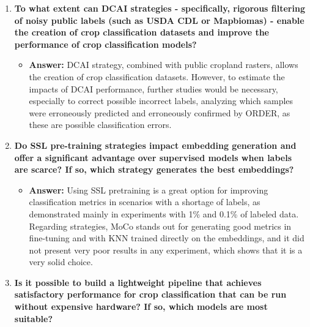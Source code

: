 \begin{enumerate}[label=\textbf{RQ\arabic*:}, leftmargin=*, parsep=1em]

    \item \textbf{To what extent can DCAI strategies - specifically, rigorous filtering of noisy public labels (such as USDA CDL or Mapbiomas) - enable the creation of crop classification datasets and improve the performance of crop classification models?}
    
    \begin{itemize}[label=$\hookrightarrow$, leftmargin=2em, topsep=0.5em]
        \item \textbf{Answer:}
        DCAI strategy, combined with public cropland rasters, allows the creation of crop classification datasets. However, to estimate the impacts of DCAI performance, further studies would be necessary, especially to correct possible incorrect labels, analyzing which samples were erroneously predicted and erroneously confirmed by ORDER, as these are possible classification errors.
    \end{itemize}

    \item \textbf{Do SSL pre-training strategies impact embedding generation and offer a significant advantage over supervised models when labels are scarce? If so, which strategy generates the best embeddings?}
    
    \begin{itemize}[label=$\hookrightarrow$, leftmargin=2em, topsep=0.5em]
        \item \textbf{Answer:}
        Using SSL pretraining is a great option for improving classification metrics in scenarios with a shortage of labels, as demonstrated mainly in experiments with 1\% and 0.1\% of labeled data. Regarding strategies, MoCo stands out for generating good metrics in fine-tuning and with KNN trained directly on the embeddings, and it did not present very poor results in any experiment, which shows that it is a very solid choice.
    \end{itemize}

    \item \textbf{Is it possible to build a lightweight pipeline that achieves satisfactory performance for crop classification that can be run without expensive hardware? If so, which models are most suitable?}
    

\end{enumerate}
